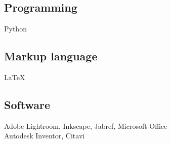 \begin{minipage}[t]{0.2\textwidth}
\section{}
\subsection{Programming}
{}
Python
\subsection{Markup language}
\LaTeX
\subsection{Software}
{}
Adobe Lightroom, Inkscape, Jabref,  Microsoft Office \\
\sectionsep
{}
Autodesk Inventor, Citavi\\\end{minipage}








